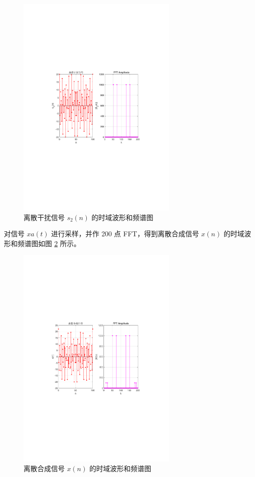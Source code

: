 \documentclass[12pt,AutoFakeBold]{article}
\begin{document}
\begin{figure}[htbp]
	\centering
	\includegraphics[width=0.7\textwidth]{figure/sn2.pdf}
	\caption{离散干扰信号 $s_2(n)$ 的时域波形和频谱图} \label{fig:sn2}
\end{figure}

对信号 $xa(t)$ 进行采样，并作 200 点 FFT，得到离散合成信号 $x(n)$ 的时域波形和频谱图如图 \ref{fig:xn} 所示。 

\begin{figure}[htbp]
	\centering
	\includegraphics[width=0.7\textwidth]{figure/xn.pdf}
	\caption{离散合成信号 $x(n)$ 的时域波形和频谱图} \label{fig:xn}
\end{figure}
\end{document}

